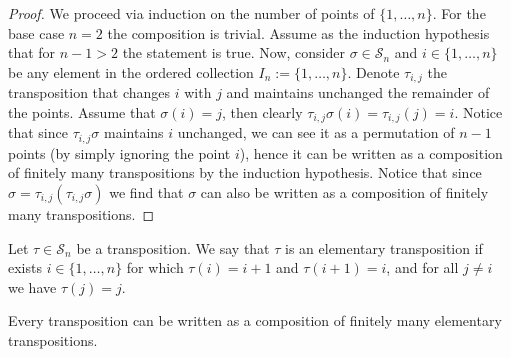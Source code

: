 \begin{proof}
  We proceed via induction on the number of points of \(\{1, \dots, n\}\). For
  the base case \(n = 2\) the composition is trivial. Assume as the induction
  hypothesis that for \(n - 1 > 2\) the statement is true. Now, consider
  \(\sigma \in \mathcal S_n\) and \(i \in \{1, \dots, n\}\) be any element in
  the ordered collection \(I_n := \{1, \dots, n\}\). Denote \(\tau_{i, j}\) the
  transposition that changes \(i\) with \(j\) and maintains unchanged the
  remainder of the points. Assume that \(\sigma(i) = j\), then clearly
  \(\tau_{i, j} \sigma(i) = \tau_{i, j}(j) = i\). Notice that since \(\tau_{i,
  j} \sigma\) maintains \(i\) unchanged, we can see it as a permutation of \(n
  - 1\) points (by simply ignoring the point \(i\)), hence it can be written as
  a composition of finitely many transpositions by the induction hypothesis.
  Notice that since \(\sigma = \tau_{i, j} (\tau_{i, j} \sigma)\) we find that
  \(\sigma\) can also be written as a composition of finitely many
  transpositions.
\end{proof}

\begin{definition}
  Let \(\tau \in \mathcal S_n\) be a transposition. We say that \(\tau\) is an
  elementary transposition if exists \(i \in \{1, \dots, n\}\) for which
  \(\tau(i) = i + 1\) and \(\tau(i + 1) = i\), and for all \(j \neq i\) we have
  \(\tau(j) = j\).
\end{definition}

\begin{proposition}
  Every transposition can be written as a composition of finitely many
  elementary transpositions.
\end{proposition}

